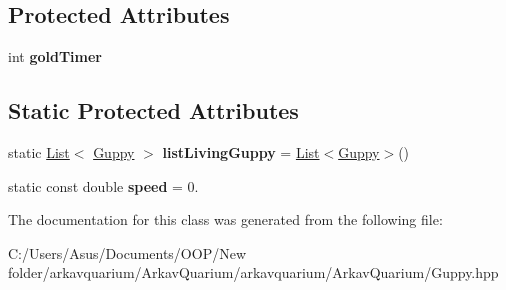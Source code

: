 \subsection*{Protected Attributes}
\begin{DoxyCompactItemize}
\item 
\mbox{\label{class_guppy_ac91b6d5ced32faecdfe47909cb3238c8}} 
int {\bfseries gold\+Timer}
\end{DoxyCompactItemize}
\subsection*{Static Protected Attributes}
\begin{DoxyCompactItemize}
\item 
\mbox{\label{class_guppy_a52f825cc6cf31e682a3a3ce27b3f1390}} 
static \mbox{\hyperlink{class_list}{List}}$<$ \mbox{\hyperlink{class_guppy}{Guppy}} $>$ {\bfseries list\+Living\+Guppy} = \mbox{\hyperlink{class_list}{List}}$<$\mbox{\hyperlink{class_guppy}{Guppy}}$>$()
\item 
\mbox{\label{class_guppy_ae474e8947cad2d165e3b80bb6eb6b51f}} 
static const double {\bfseries speed} = 0.
\end{DoxyCompactItemize}


The documentation for this class was generated from the following file\+:\begin{DoxyCompactItemize}
\item 
C\+:/\+Users/\+Asus/\+Documents/\+O\+O\+P/\+New folder/arkavquarium/\+Arkav\+Quarium/arkavquarium/\+Arkav\+Quarium/Guppy.\+hpp\end{DoxyCompactItemize}
